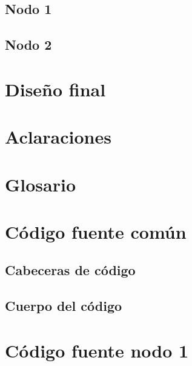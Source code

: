 \documentclass[a4paper,oneside,12pt]{article}
\begin{document}
\subsection{Nodo 1}

\subsection{Nodo 2}


\section{Diseño final}

\section{Aclaraciones}

\section{Glosario}

\appendix
\section{Código fuente común}
\label{anx:common-code}
\subsection{Cabeceras de código}



\subsection{Cuerpo del código}




\section{Código fuente nodo 1}
\end{document}
